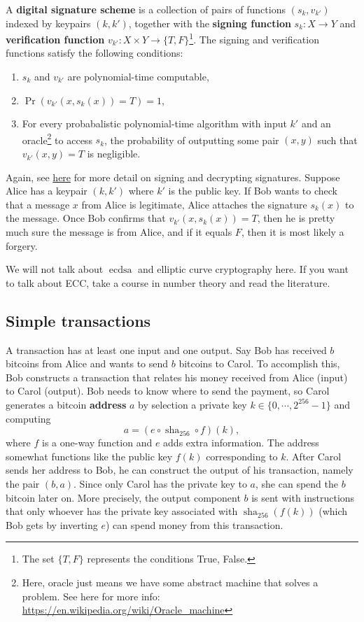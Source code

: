     \begin{definition}[]
        A \textbf{digital signature scheme} is a collection of pairs of functions $(s_k,v_{k'})$ indexed by keypairs $(k,k')$, together with the \textbf{signing function} $s_k \colon X \to Y$ and \textbf{verification function} $v_{k'}\colon X\times Y \to \{T,F\} $\footnote{The set $\{T,F\} $ represents the conditions True, False.}. The signing and verification functions satisfy the following conditions:
        \begin{enumerate}
            \item $s_k$ and $v_{k'}$ are polynomial-time computable,
            \item $\operatorname{Pr}(v_{k'}(x,s_k(x))=T)=1$,
            \item For every probabalistic polynomial-time algorithm with input $k'$ and an oracle\footnote{Here, oracle just means we have some abstract machine that solves a problem. See here for more info: \url{https://en.wikipedia.org/wiki/Oracle_machine}} to access $s_k$, the probability of outputting some pair $(x,y)$ such that $v_{k'}(x,y)=T$ is negligible.
        \end{enumerate}
    \end{definition}
    Again, see \href{https://simonxiang.xyz/blog/proving-rsa-encryption-an-application-of-group-theory-part-3-digital-signatures-and-eulers-totient-function}{here} for more detail on signing and decrypting signatures. Suppose Alice has a keypair $(k,k')$ where $k'$ is the public key. If Bob wants to check that a message $x$ from Alice is legitimate, Alice attaches the signature $s_k(x)$ to the message. Once Bob confirms that $v_{k'}(x,s_k(x))=T$, then he is pretty much sure the message is from Alice, and if it equals $F$, then it is most likely a forgery.

    We will not talk about $\operatorname{ecdsa}$ and elliptic curve cryptography here. If you want to talk about ECC, take a course in number theory and read the literature.
    \subsection*{Simple transactions}
    A transaction has at least one input and one output. Say Bob has received $b$ bitcoins from Alice and wants to send $b$ bitcoins to Carol. To accomplish this, Bob constructs a transaction that relates his money received from Alice (input) to Carol (output). Bob needs to know where to send the payment, so Carol generates a bitcoin \textbf{address} $a$ by selection a private key $k \in \{0,\cdots ,2^{256}-1\} $ and computing \[
        a=(e \circ \operatorname{sha}_{256}\circ f)(k),
    \] where $f$ is a one-way function and $e$ adds extra information. The address somewhat functions like the public key $f(k)$ corresponding to $k$. After Carol sends her address to Bob, he can construct the output of his transaction, namely the pair $(b,a)$. Since only Carol has the private key to $a$, she can spend the $b$ bitcoin later on. More precisely, the output component $b$ is sent with instructions that only whoever has the private key associated with $\operatorname{sha}_{256}(f(k))$ (which Bob gets by inverting $e$) can spend money from this transaction.

